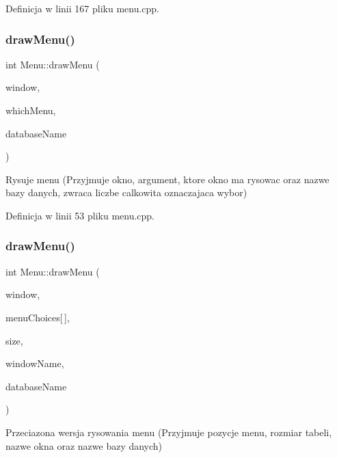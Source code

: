 Definicja w linii 167 pliku menu.\+cpp.

\mbox{\label{class_menu_a452bfc7ce14d367bdf38cee636f09b0c}} 
\subsubsection{\texorpdfstring{draw\+Menu()}{drawMenu()}\hspace{0.1cm}{\footnotesize\ttfamily [1/2]}}
{\footnotesize\ttfamily int Menu\+::draw\+Menu (\begin{DoxyParamCaption}\item[{W\+I\+N\+D\+OW $\ast$}]{window,  }\item[{Choices\+::choices\+\_\+t}]{which\+Menu,  }\item[{std\+::string}]{database\+Name }\end{DoxyParamCaption})\hspace{0.3cm}{\ttfamily [static]}}

Rysuje menu (Przyjmuje okno, argument, ktore okno ma rysowac oraz nazwe bazy danych, zwraca liczbe calkowita oznaczajaca wybor) 

Definicja w linii 53 pliku menu.\+cpp.

\mbox{\label{class_menu_a8c2a73e33c0cbf1a8b09b2c4831ea2b8}} 
\subsubsection{\texorpdfstring{draw\+Menu()}{drawMenu()}\hspace{0.1cm}{\footnotesize\ttfamily [2/2]}}
{\footnotesize\ttfamily int Menu\+::draw\+Menu (\begin{DoxyParamCaption}\item[{W\+I\+N\+D\+OW $\ast$}]{window,  }\item[{const std\+::string}]{menu\+Choices\mbox{[}$\,$\mbox{]},  }\item[{unsigned int}]{size,  }\item[{std\+::string}]{window\+Name,  }\item[{std\+::string}]{database\+Name }\end{DoxyParamCaption})\hspace{0.3cm}{\ttfamily [static]}}

Przeciazona wersja rysowania menu (Przyjmuje pozycje menu, rozmiar tabeli, nazwe okna oraz nazwe bazy danych) 


